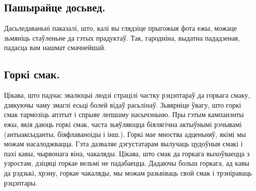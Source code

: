 \subsection{Пашырайце досьвед.}
Дасьледаваньні паказалі, што, калі вы глядзіце прыгожыя фота ежы, можаце зьмяніць стаўленьне да гэтых прадуктаў. Так, гародніна, выдатна пададзеная, падасца вам нашмат смачнейшай.

\subsection{Горкі смак.}
Цікава, што падчас эвалюцыі людзі страцілі частку рэцэптараў да горкага смаку, дзякуючы чаму змаглі есьці болей відаў расьлінаў. Зьвярніце ўвагу, што горкі смак тармозіць апэтыт і спрыяе лепшаму насычэньню. Пры гэтым кампанэнты ежы, якія даюць горкі смак, часта зьяўляюцца біялягічна актыўнымі рэчывамі (антыаксыданты, біяфлаваноіды і інш.). Горкі мае мноства адценьняў, якімі мы можам насалоджвацца. Гэта дазваляе дэгустатарам вылучаць цудоўныя смакі і пахі кавы, чырвонага віна, чакаляды. Цікава, што смак да горкага выхоўваецца з узростам, дзіцяці горкае вельмі не падабаецца. Дадаючы больш горкага, ад кавы да рэдзькі, хрэну, горкае чакаляды, мы можам разьвіваць свой смак і трэніраваць рэцэптары.

